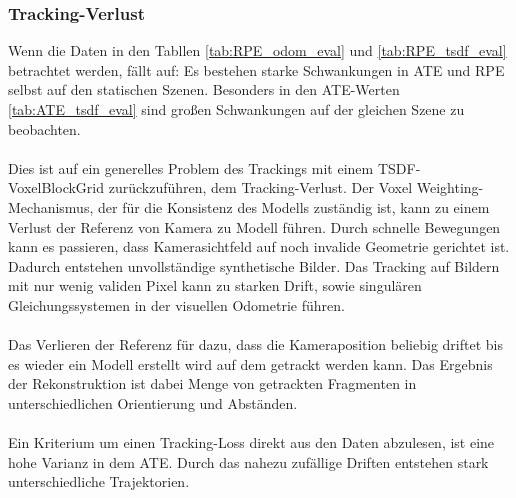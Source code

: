 \documentclass[12pt,DIV=15,BCOR=15mm,twoside,headsepline,abstract=true,listof=totoc,bibliography=totoc]{scrreprt}
\theoremstyle{remark}    %
\begin{document}
    \subsubsection{Tracking-Verlust}
    Wenn die Daten in den Tabllen \ref{tab:RPE_odom_eval} und \ref{tab:RPE_tsdf_eval} betrachtet werden, fällt auf: Es bestehen starke Schwankungen 
    in \ac{ATE} und \ac{RPE} selbst auf den statischen Szenen. Besonders in den ATE-Werten \ref{tab:ATE_tsdf_eval} sind großen Schwankungen auf der gleichen Szene
    zu beobachten.\\\\
    Dies ist auf ein generelles Problem des Trackings mit einem \ac{TSDF}-VoxelBlockGrid zurückzuführen, dem Tracking-Verlust. 
    Der Voxel Weighting-Mechanismus, der für die Konsistenz des Modells zuständig ist, kann zu einem Verlust der Referenz von Kamera zu Modell führen.
    Durch schnelle Bewegungen kann es passieren, dass Kamerasichtfeld auf noch invalide Geometrie gerichtet ist. Dadurch entstehen unvollständige 
    synthetische Bilder. Das Tracking auf Bildern mit nur wenig validen Pixel kann zu starken Drift, sowie singulären Gleichungssystemen in der visuellen 
    Odometrie führen.\\\\
    Das Verlieren der Referenz für dazu, dass die Kameraposition beliebig driftet bis es wieder ein Modell erstellt wird auf dem getrackt werden kann. Das Ergebnis
    der Rekonstruktion ist dabei Menge von getrackten Fragmenten in unterschiedlichen Orientierung und Abständen.\\\\
    Ein Kriterium um einen Tracking-Loss direkt aus den Daten abzulesen, ist eine hohe Varianz in dem \ac{ATE}. Durch das nahezu zufällige Driften entstehen stark
    unterschiedliche Trajektorien.
\end{document}
